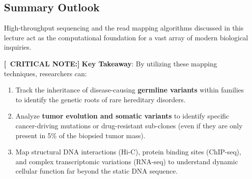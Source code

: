 \documentclass[11pt,a4paper]{article}
\newcommand{\sta}{\textbf{[\textasteriskcentered\ CRITICAL NOTE:] }}
\begin{document}
\subsection{Summary Outlook}
High-throughput sequencing and the read mapping algorithms discussed in this lecture act as the computational foundation for a vast array of modern biological inquiries. 

\sta \textbf{Key Takeaway}: By utilizing these mapping techniques, researchers can:
\begin{enumerate}
    \item Track the inheritance of disease-causing \textbf{germline variants} within families to identify the genetic roots of rare hereditary disorders.
    \item Analyze \textbf{tumor evolution and somatic variants} to identify specific cancer-driving mutations or drug-resistant sub-clones (even if they are only present in 5\% of the biopsied tumor mass).
    \item Map structural DNA interactions (Hi-C), protein binding sites (ChIP-seq), and complex transcriptomic variations (RNA-seq) to understand dynamic cellular function far beyond the static DNA sequence.
\end{enumerate}
\end{document}
